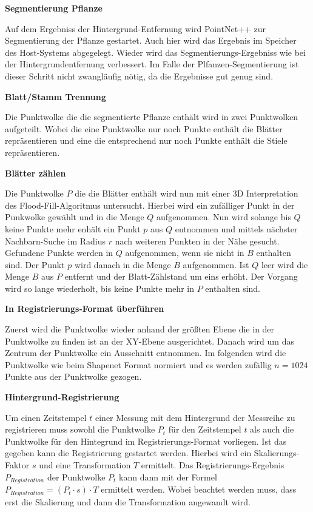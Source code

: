 \documentclass[12pt,titlepage, twoside]{article}
\begin{document}

\textbf{Segmentierung Pflanze}

Auf dem Ergebniss der Hintergrund-Entfernung wird PointNet++ zur Segmentierung der Pflanze gestartet. Auch hier wird das Ergebnis im Speicher des Host-Systems abgegelegt. 
Wieder wird das Segmentierungs-Ergebniss wie bei der Hintergrundentfernung verbessert. Im Falle der Plfanzen-Segmentierung ist dieser Schritt nicht zwangläufig nötig, da die Ergebnisse gut genug sind.

\textbf{Blatt/Stamm Trennung}

Die Punktwolke die die segmentierte Pflanze enthält wird in zwei Punktwolken aufgeteilt. 
Wobei die eine Punktwolke nur noch Punkte enthält die Blätter repräsentieren und eine die entsprechend nur noch Punkte enthält die Stiele repräsentieren.

\textbf{Blätter zählen}

Die Punktwolke $P$ die die Blätter enthält wird nun mit einer 3D Interpretation des Flood-Fill-Algoritmus untersucht. Hierbei wird ein zufälliger Punkt in der Punkwolke gewählt und in die Menge $Q$ aufgenommen.
Nun wird solange bis $Q$ keine Punkte mehr enhält ein Punkt $p$ aus $Q$ entnommen und mittels nächster Nachbarn-Suche im Radius $r$ nach weiteren Punkten in der Nähe gesucht. Gefundene Punkte werden in $Q$ aufgenommen, wenn sie nicht in $B$ enthalten sind.
Der Punkt $p$ wird danach in die Menge $B$ aufgenommen. Ist $Q$ leer wird die Menge $B$ aus $P$ entfernt und der Blatt-Zählstand um eins erhöht. 
Der Vorgang wird so lange wiederholt, bis keine Punkte mehr in $P$ enthalten sind.

\textbf{In Registrierungs-Format überführen}

Zuerst wird die Punktwolke wieder anhand der größten Ebene die in der Punktwolke zu finden ist an der XY-Ebene ausgerichtet.
Danach wird um das Zentrum der Punktwolke ein Ausschnitt entnommen. 
Im folgenden wird die Punktwolke wie beim Shapenet Format normiert und es werden zufällig $n=1024$ Punkte aus der Punktwolke gezogen.

\textbf{Hintergrund-Registrierung}

Um einen Zeitstempel $t$ einer Messung mit dem Hintergrund der Messreihe zu registrieren muss sowohl die Punktwolke $P_t$ für den Zeitstempel $t$ als auch die Punktwolke für den Hintegrund im Registrierungs-Format vorliegen.
Ist das gegeben kann die Registrierung gestartet werden. Hierbei wird ein Skalierungs-Faktor $s$ und eine Transformation $T$ ermittelt. 
Das Registrierungs-Ergebnis $P_{Registration}$ der Punktwolke $P_t$ kann dann mit der Formel $P_{Registration} = (P_t \cdot s) \cdot T$ ermittelt werden. Wobei beachtet werden muss, dass erst die Skalierung und dann die Transformation angewandt wird.
\end{document}
